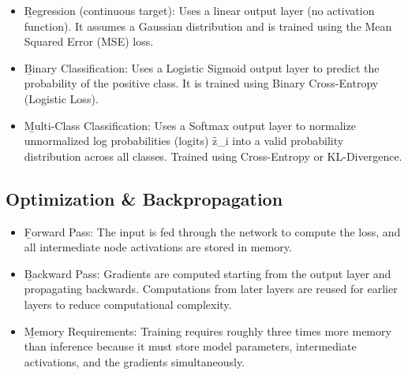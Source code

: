 \begin{itemize}
\item \b{Regression} (continuous target): Uses a linear output layer (no activation function). It assumes a Gaussian distribution and is trained using the Mean Squared Error (MSE) loss.
\item \b{Binary Classification}: Uses a Logistic Sigmoid output layer to predict the probability of the positive class. It is trained using Binary Cross-Entropy (Logistic Loss).
\item \b{Multi-Class Classification}: Uses a Softmax output layer to normalize unnormalized log probabilities (logits) \f{z_i} into a valid probability distribution across all classes. Trained using Cross-Entropy or KL-Divergence.
\end{itemize}






\subsection{Optimization \& Backpropagation}

\begin{itemize}
\item \b{Forward Pass}: The input is fed through the network to compute the loss, and all intermediate node activations are stored in memory.
\item \b{Backward Pass}: Gradients are computed starting from the output layer and propagating backwards. Computations from later layers are reused for earlier layers to reduce computational complexity.
\item \b{Memory Requirements}: Training requires roughly three times more memory than inference because it must store model parameters, intermediate activations, and the gradients simultaneously.
\end{itemize}

